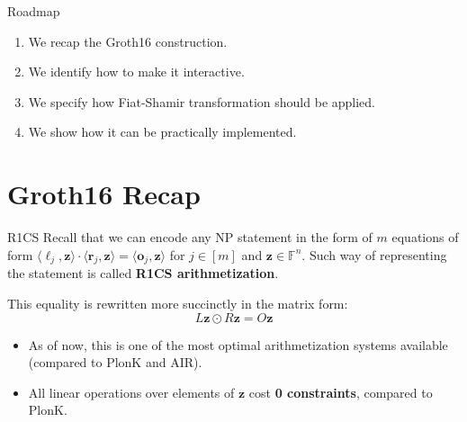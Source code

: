 \documentclass{zkdl-presentation-template}
\begin{document}
    \begin{frame}{Roadmap}
        \begin{enumerate}
            \item We recap the Groth16 construction.
            \item We identify how to make it interactive.
            \item We specify how Fiat-Shamir transformation should be applied.
            \item We show how it can be practically implemented.
        \end{enumerate}
    \end{frame}

    \section{Groth16 Recap}

    \begin{frame}{R1CS}
        Recall that we can encode any NP statement in the form of $m$ equations
        of form $\langle \boldsymbol{\ell}_j, \mathbf{z} \rangle \cdot \langle
        \boldsymbol{r}_j, \mathbf{z} \rangle = \langle \boldsymbol{o}_j,
        \mathbf{z} \rangle$ for $j \in [m]$ and $\mathbf{z} \in \mathbb{F}^n$.
        Such way of representing the statement is called \textbf{R1CS
        arithmetization}.\pause

        This equality is rewritten more succinctly in the matrix form:
        \begin{equation*}
            L\mathbf{z} \odot R\mathbf{z} = O\mathbf{z}
        \end{equation*}

        \pause\begin{itemize}[label=\cmark]
            \item As of now, this is one of the most optimal arithmetization
            systems available (compared to PlonK and AIR).
            \item All linear operations over elements of $\mathbf{z}$ cost
            \textbf{0 constraints}, compared to PlonK.
        \end{itemize}
    \end{frame}
\end{document}
